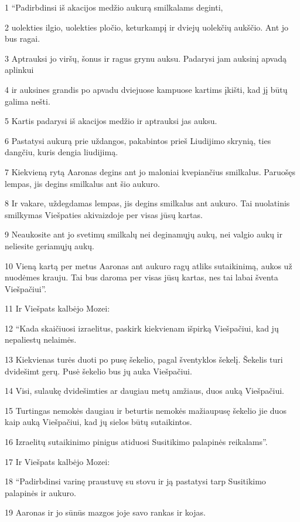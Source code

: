 \par 1 “Padirbdinsi iš akacijos medžio aukurą smilkalams deginti, 
\par 2 uolekties ilgio, uolekties pločio, keturkampį ir dviejų uolekčių aukščio. Ant jo bus ragai. 
\par 3 Aptrauksi jo viršų, šonus ir ragus grynu auksu. Padarysi jam auksinį apvadą aplinkui 
\par 4 ir auksines grandis po apvadu dviejuose kampuose kartims įkišti, kad jį būtų galima nešti. 
\par 5 Kartis padarysi iš akacijos medžio ir aptrauksi jas auksu. 
\par 6 Pastatysi aukurą prie uždangos, pakabintos prieš Liudijimo skrynią, ties dangčiu, kuris dengia liudijimą. 
\par 7 Kiekvieną rytą Aaronas degins ant jo maloniai kvepiančius smilkalus. Paruošęs lempas, jis degins smilkalus ant šio aukuro. 
\par 8 Ir vakare, uždegdamas lempas, jis degins smilkalus ant aukuro. Tai nuolatinis smilkymas Viešpaties akivaizdoje per visas jūsų kartas. 
\par 9 Neaukosite ant jo svetimų smilkalų nei deginamųjų aukų, nei valgio aukų ir neliesite geriamųjų aukų. 
\par 10 Vieną kartą per metus Aaronas ant aukuro ragų atliks sutaikinimą, aukos už nuodėmes krauju. Tai bus daroma per visas jūsų kartas, nes tai labai šventa Viešpačiui”. 
\par 11 Ir Viešpats kalbėjo Mozei: 
\par 12 “Kada skaičiuosi izraelitus, paskirk kiekvienam išpirką Viešpačiui, kad jų nepaliestų nelaimės. 
\par 13 Kiekvienas turės duoti po pusę šekelio, pagal šventyklos šekelį. Šekelis turi dvidešimt gerų. Pusė šekelio bus jų auka Viešpačiui. 
\par 14 Visi, sulaukę dvidešimties ar daugiau metų amžiaus, duos auką Viešpačiui. 
\par 15 Turtingas nemokės daugiau ir beturtis nemokės mažiau­pusę šekelio jie duos kaip auką Viešpačiui, kad jų sielos būtų sutaikintos. 
\par 16 Izraelitų sutaikinimo pinigus atiduosi Susitikimo palapinės reikalams”. 
\par 17 Ir Viešpats kalbėjo Mozei: 
\par 18 “Padirbdinsi varinę praustuvę su stovu ir ją pastatysi tarp Susitikimo palapinės ir aukuro. 
\par 19 Aaronas ir jo sūnūs mazgos joje savo rankas ir kojas. 
